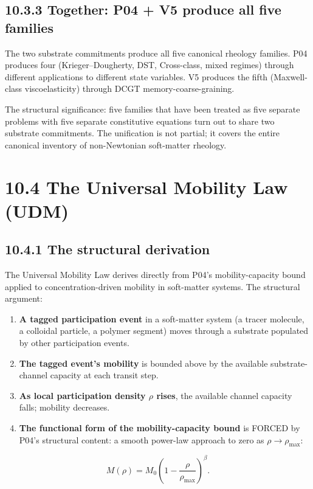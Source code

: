 \documentclass[11pt]{book}
\begin{document}
\subsection{10.3.3 Together: P04 + V5 produce all five families}

The two substrate commitments produce all five canonical rheology families. P04 produces four (Krieger–Dougherty, DST, Cross-class, mixed regimes) through different applications to different state variables. V5 produces the fifth (Maxwell-class viscoelasticity) through DCGT memory-coarse-graining.

The structural significance: five families that have been treated as five separate problems with five separate constitutive equations turn out to share two substrate commitments. The unification is not partial; it covers the entire canonical inventory of non-Newtonian soft-matter rheology.

\section{10.4 The Universal Mobility Law (UDM)}

\subsection{10.4.1 The structural derivation}

The Universal Mobility Law derives directly from P04's mobility-capacity bound applied to concentration-driven mobility in soft-matter systems. The structural argument:

\begin{enumerate}
\item \textbf{A tagged participation event} in a soft-matter system (a tracer molecule, a colloidal particle, a polymer segment) moves through a substrate populated by other participation events.
\item \textbf{The tagged event's mobility} is bounded above by the available substrate-channel capacity at each transit step.
\item \textbf{As local participation density $\rho$ rises}, the available channel capacity falls; mobility decreases.
\item \textbf{The functional form of the mobility-capacity bound} is FORCED by P04's structural content: a smooth power-law approach to zero as $\rho \to \rho_\mathrm{max}$:
\end{enumerate}
\[
M(\rho) = M_0\left(1 - \frac{\rho}{\rho_\mathrm{max}}\right)^\beta.
\]
\end{document}
